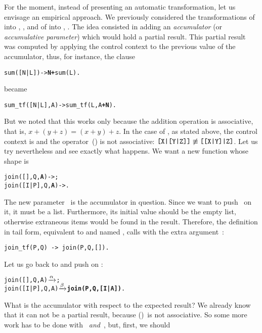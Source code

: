For the moment, instead of presenting an automatic transformation, let
us envisage an empirical approach. We previously considered the
transformations of  into ,
, and of  into
, . The idea consisted in
adding an \emph{accumulator} (or \emph{accumulative parameter}) which
would hold a partial result. This partial result was computed by
applying the control context to the previous value of the accumulator,
thus, for instance, the clause
\begin{alltt}
sum([N|L]) -> \textbf{N +} sum(L).
\end{alltt}
became
\begin{alltt}
sum_tf([N|L],A) -> sum_tf(L,A\textbf{+N}).
\end{alltt}
But we noted that this works only because the addition operation is
associative, that is, \(x + (y + z) = (x + y) + z\). In the case of
, as stated above, the control context is
\erlcode{[I|\textvisiblespace]} and the operator~(\erlcode{|}) is not
associative: \(\texttt{[X|[Y|Z]]} \not\equiv
\texttt{[[X|Y]|Z]}\). Let us try nevertheless and see exactly what
happens. We want a new function  whose shape
is\label{trans_join}
\begin{alltt}
join(   [],Q,\textbf{A}) -> ;
join([I|P],Q,\textbf{A}) -> .
\end{alltt}
The new parameter~ is the accumulator in question. Since we
want to push~ on it, it must be a list. Furthermore, its
initial value should be the empty list, otherwise extraneous items
would be found in the result. Therefore, the definition in tail form,
equivalent to  and named , calls
 with the extra argument~\erlcode{[]}:
\begin{verbatim}
join_tf(P,Q) -> join(P,Q,[]).
\end{verbatim}
Let us go back to  and push  on
:
\begin{alltt}
join(   [],Q,A) \(\smashedrightarrow{\alpha}\) ;
join([I|P],Q,A) \(\smashedrightarrow{\beta}\) \textbf{join(P,Q,[I|A])}.
\end{alltt}
What is the accumulator with respect to the expected result? We
already know that it can not be a partial result, because
(\erlcode{|})~is not associative. So some more work has to be done
with ~\emph{and}~, but, first, we should
